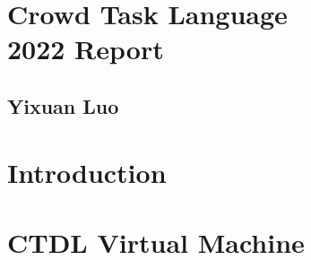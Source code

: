 \documentclass[10pt, oneside]{book}
\begin{document}
\frontmatter
%
\chapter*{\Huge \center Crowd Task Language \\ 2022 Report}
\thispagestyle{empty}
\section*{\huge \center Yixuan Luo}
%
\tableofcontents
%
\mainmatter
%
\chapter{Introduction}
%





\chapter{CTDL Virtual Machine}

\appendix

\backmatter
\end{document}
